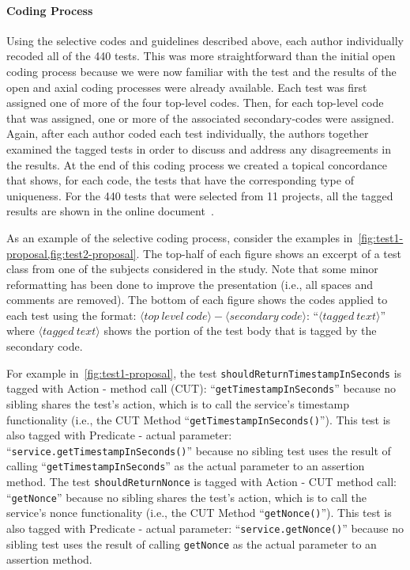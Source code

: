\paragraph{Coding Process}

Using the selective codes and guidelines described above, each author individually recoded all of the \num{440} tests.
%
This was more straightforward than the initial open coding process because we were now familiar with the test and the results of the open and axial coding processes were already available.
%
Each test was first assigned one of more of the four top-level codes.
%
Then, for each top-level code that was assigned, one or more of the associated secondary-codes were assigned.
%
Again, after each author coded each test individually, the authors together examined the tagged tests in order to discuss and address any disagreements in the results.
%
At the end of this coding process we created a topical concordance that shows, for each code, the tests that have the corresponding type of uniqueness.
%
For the \num{440} tests that were selected from \num{11} projects, all the tagged results are shown in the online document~\cite{emp-study}.

As an example of the selective coding process, consider the examples in~\cref{fig:test1-proposal,fig:test2-proposal}.
%
The top-half of each figure shows an excerpt of a test class from one of the subjects considered in the study.
%
Note that some minor reformatting has been done to improve the presentation (i.e., all spaces and comments are removed).
%
The bottom of each figure shows the codes applied to each test using the format: $\langle top~level~code \rangle - \langle secondary~code \rangle$: \enquote{$\langle tagged~text \rangle $} where $\langle tagged~text \rangle $ shows the portion of the test body that is tagged by the secondary code.

For example in~\cref{fig:test1-proposal}, the test \texttt{should\-Return\-Timestamp\-In\-Seconds} is tagged with Action - method call (CUT): \enquote{\texttt{getTimestampInSeconds}} because no sibling shares the test’s action, which is to call the service’s timestamp functionality (i.e., the CUT Method \enquote{\texttt{getTimestampInSeconds()}}).
%
This test is also tagged with Predicate - actual parameter: \enquote{\texttt{service.getTimestampInSeconds()}} because no sibling test uses the result of calling \enquote{\texttt{getTimestampInSeconds}} as the actual parameter to an assertion method.
%
The test \texttt{should\-Return\-Nonce} is tagged with Action - CUT method call: \enquote{\texttt{getNonce}} because no sibling shares the test’s action, which is to call the service’s nonce functionality (i.e., the CUT Method \enquote{\texttt{getNonce()}}).
%
This test is also tagged with Predicate - actual parameter: \enquote{\texttt{service.getNonce()}} because no sibling test uses the result of calling \texttt{getNonce} as the actual parameter to an assertion method.


